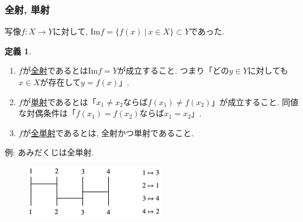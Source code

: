 \documentclass[dvipdfmx,cjk,10.2pt]{beamer}
\newcommand{\Imag}{\mathrm{Im}}
\theoremstyle{definition}
\newtheorem{Def}[Thm]{定義}
\begin{document}
\begin{frame}
\frametitle{全射, 単射}

写像$f:X\rightarrow Y$に対して, 
$\Imag f =\{ f(x) \ | \ x \in X\} \subset Y$であった. 
\begin{Def}
\begin{enumerate}
\item $f$が\underline{全射}であるとは$\Imag f = Y$が成立すること. 
つまり「どの$y \in Y$に対しても$x \in X$が存在して$y=f(x)$」. 
\item $f$が\underline{単射}であるとは「$x_1\ne x_2$ならば$f(x_1)\ne f(x_2)$」が成立すること. 
同値な対偶条件は「$f(x_1)= f(x_2)$ならば$x_1= x_2$」.  
\item $f$が\underline{全単射}であるとは, 全射かつ単射であること. 
\end{enumerate}
\end{Def}

例: あみだくじは全単射. 

\vspace{-2mm}

 \begin{figure}[htbp]
 \begin{center} 
  \includegraphics[width=60mm]{amida.png}
 \end{center}
\end{figure}

\vspace{-2mm}


\end{frame}

\end{document}
